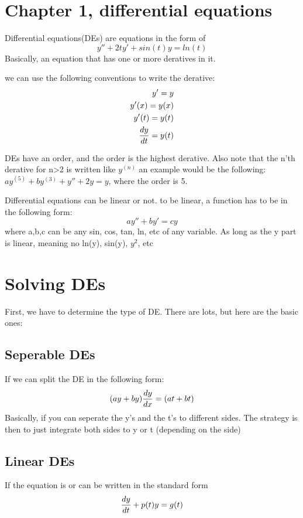 \documentclass[17pt]{extarticle} %
\begin{document}
\newcommand\abs[1]{\left|#1\right|} %
\newcommand{\seq}[2][0]{\left\{ #2 \right\}_{n=#1}}
\newtheorem{theorem}{Theorem}
\newtheorem*{theorem*}{Theorem}
\newtheorem*{definition}{Definition}

\section{Chapter 1, differential equations}

Differential equations(DEs) are equations in the form of 
$$
y'' + 2ty' + sin(t)y = ln(t)
$$
Basically, an equation that has one or more deratives in it.

we can use the following conventions to write the derative:
$$
\begin{aligned}
    y' = y \\
y'(x) = y(x) \\
y'(t) = y(t) \\
{dy\over dt} = y(t)
\end{aligned}
$$

DEs have an order, and the order is the highest derative.
Also note that the n'th derative for n>2 is written like $y^{(n)}$
an example would be the following:
$a y^{(5)} + b y^{(3)} + y'' + 2y = y$, where the order is 5.

Differential equations can be linear or not. 
to be linear, a function has to be in the following form: 
$$
ay'' + by' = cy
$$
where a,b,c can be any sin, cos, tan, ln, etc of any variable. As long as the y part is linear, meaning no
ln(y), sin(y), $y^2$, etc

\newpage
\section{Solving DEs}
First, we have to determine the type of DE. There are lots, but here are the basic ones:

\subsection{Seperable DEs}
If we can split the DE in the following form:
$$
(ay + by ){dy \over dx} = (at + bt)
$$
Basically, if you can seperate the y's and the t's to different sides.
The strategy is then to just integrate both sides to  y or t (depending on the side)

\subsection{Linear DEs}
If the equation is or can be written in the standard form 
$$
{dy\over dt} + p(t) y= g(t)
$$
\end{document}
